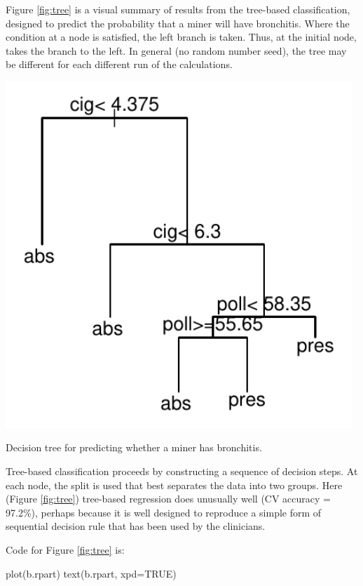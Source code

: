 Figure \ref{fig:tree} is a visual summary of results from the
tree-based classification, designed to predict the probability that a
miner will have bronchitis.  Where the condition at a node is
satisfied, the left branch is taken. Thus, at the initial node,
 takes the branch to the left.  In general (no
random number seed), the tree may be different for each
different run of the calculations.

\begin{marginfigure}
\begin{Schunk}


\centerline{\includegraphics[width=0.98\textwidth]{figs/9-treefig-1} }

\end{Schunk}
\caption{Decision tree for predicting whether a miner has
    bronchitis.
}\label{fig:tree}
\end{marginfigure} 

Tree-based classification proceeds by constructing a sequence of
decision steps. At each node, the split is used that best separates
the data into two groups.  Here (Figure \ref{fig:tree}) tree-based
regression does unusually well (CV accuracy = 97.2\%), perhaps because
it is well designed to reproduce a simple form of sequential decision
rule that has been used by the clinicians.

\begin{marginfigure}
Code for Figure \ref{fig:tree} is:
\begin{Schunk}
\begin{Sinput}
plot(b.rpart)
text(b.rpart, xpd=TRUE)
\end{Sinput}
\end{Schunk}
\end{marginfigure}

